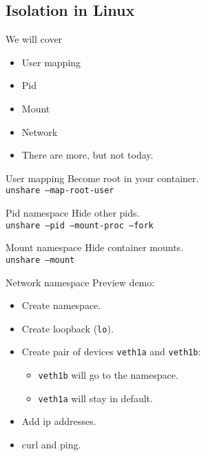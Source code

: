 \documentclass[14pt]{beamer}
\begin{document}
\subsection{Isolation in Linux}
\begin{frame}{We will cover}
    \begin{itemize}[<+(1)->]
        \item User mapping
        \item Pid
        \item Mount
        \item Network
        \item There are more, but not today.
    \end{itemize}
\end{frame}

\begin{frame}{User mapping}
    Become root in your container. \\
    {
        \tt unshare --map-root-user
    }
\end{frame}

\begin{frame}{Pid namespace}
    Hide other pids. \\
    {
        \tt unshare --pid --mount-proc --fork
    }
\end{frame}

\begin{frame}{Mount namespace}
    Hide container mounts. \\
    {
        \tt unshare --mount
    }
\end{frame}

\begin{frame}{Network namespace}
    Preview demo:
    \begin{itemize}[<+(1)->]
        \item Create namespace.
        \item Create loopback ({\tt lo}).
        \item Create pair of devices {\tt veth1a} and {\tt veth1b}:
            \begin{itemize}
                \item {\tt veth1b} will go to the namespace.
                \item {\tt veth1a} will stay in default.
            \end{itemize}
        \item Add ip addresses.
        \item curl and ping.
    \end{itemize}
\end{frame}
\end{document}
